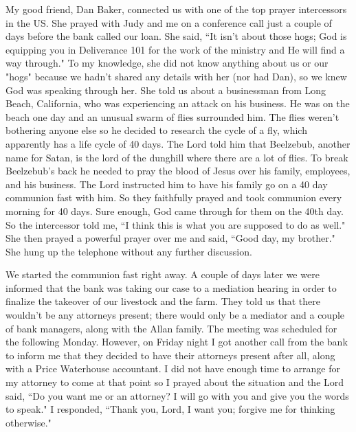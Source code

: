 \documentclass[oneside,12pt]{book}
\begin{document}
My good friend, Dan Baker, connected us with one of the top prayer intercessors in the US. She prayed with Judy and me on a conference call just a couple of days before the bank called our loan. She said, ``It isn't about those hogs; God is equipping you in Deliverance 101 for the work of the ministry and He will find a way through." To my knowledge, she did not know anything about us or our "hogs" because we hadn't shared any details with her (nor had Dan), so we knew God was speaking through her. She told us about a businessman from Long Beach, California, who was experiencing an attack on his business. He was on the beach one day and an unusual swarm of flies surrounded him. The flies weren't bothering anyone else so he decided to research the cycle of a fly, which apparently has a life cycle of 40 days. The Lord told him that Beelzebub, another name for Satan, is the lord of the dunghill where there are a lot of flies. To break Beelzebub's back he needed to pray the blood of Jesus over his family, employees, and his business. The Lord instructed him to have his family go on a 40 day communion fast with him. So they faithfully prayed and took communion every morning for 40 days. Sure enough, God came through for them on the 40th day. So the intercessor told me, ``I think this is what you are supposed to do as well." She then prayed a powerful prayer over me and said, ``Good day, my brother." She hung up the telephone without any further discussion.

We started the communion fast right away. A couple of days later we were informed that the bank was taking our case to a mediation hearing in order to finalize the takeover of our livestock and the farm. They told us that there wouldn't be any attorneys present; there would only be a mediator and a couple of bank managers, along with the Allan family. The meeting was scheduled for the following Monday. However, on Friday night I got another call from the bank to inform me that they decided to have their attorneys present after all, along with a Price Waterhouse accountant. I did not have enough time to arrange for my attorney to come at that point so I prayed about the situation and the Lord said, ``Do you want me or an attorney? I will go with you and give you the words to speak." I responded, ``Thank you, Lord, I want you; forgive me for thinking otherwise."
\end{document}
